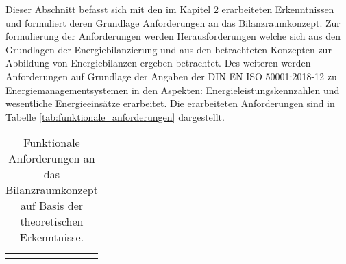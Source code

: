 Dieser Abschnitt befasst sich mit den im Kapitel 2 erarbeiteten Erkenntnissen und formuliert deren Grundlage Anforderungen an das Bilanzraumkonzept.
Zur formulierung der Anforderungen werden Herausforderungen welche sich aus den Grundlagen der Energiebilanzierung und aus den betrachteten Konzepten zur Abbildung 
von Energiebilanzen ergeben betrachtet.
Des weiteren werden Anforderungen auf Grundlage der Angaben der DIN EN ISO 50001:2018-12 zu Energiemanagementsystemen in den Aspekten: 
Energieleistungskennzahlen und wesentliche Energieeinsätze erarbeitet.
Die erarbeiteten Anforderungen sind in Tabelle \eqref{tab:funktionale_anforderungen} dargestellt.


\begin{longtable}{| m{} | m{} | m{} | m{} |}
    \caption{Funktionale Anforderungen an das Bilanzraumkonzept auf Basis der theoretischen Erkenntnisse.} \\
    \label{tab:funktionale_anforderungen} \\ 
    

\end{longtable}

